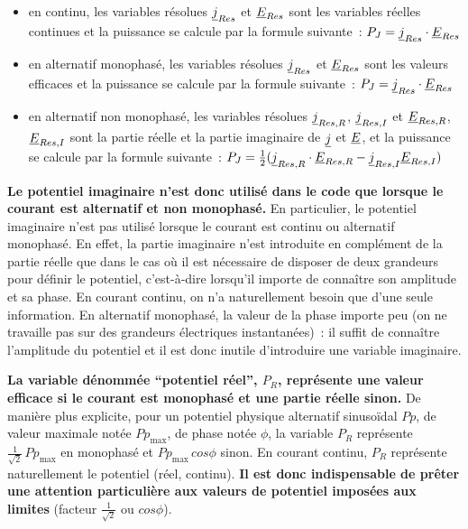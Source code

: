 \begin{itemize}
  \begin{itemize}
  \item en continu, les variables r\'esolues
$\underline{j}_{Res}$ et $\underline{E}_{Res}$
sont les variables r\'eelles continues
et la puissance se calcule par la formule suivante~:
$P_J=\underline{j}_{Res}\cdot\underline{E}_{Res}$
  \item en alternatif monophas\'e, les variables r\'esolues
$\underline{j}_{Res}$ et $\underline{E}_{Res}$
sont les valeurs efficaces
et la puissance se calcule par la formule suivante~:
$P_J=\underline{j}_{Res}\cdot\underline{E}_{Res}$
  \item en alternatif non monophas\'e, les variables r\'esolues
$\underline{j}_{Res,R}$, $\underline{j}_{Res,I}$ et $\underline{E}_{Res,R}$, $\underline{E}_{Res,I}$
sont la partie r\'eelle et la partie imaginaire de $\underline{j}$ et $\underline{E}$,
et la puissance se calcule par la formule suivante~:
$P_J=\frac{1}{2}(\underline{j}_{Res,R}\cdot\underline{E}_{Res,R}-\underline{j}_{Res,I}\underline{E}_{Res,I})$
  \end{itemize}

\end{itemize}


{\bf Le potentiel imaginaire n'est donc utilis\'e dans le code que lorsque
le courant est alternatif et non monophas\'e.}
En particulier, le potentiel imaginaire n'est pas utilis\'e lorsque le courant est
continu ou alternatif monophas\'e.
En effet, la partie imaginaire n'est introduite en compl\'ement de la partie
r\'eelle que dans le cas o\`u il est n\'ecessaire de disposer de deux grandeurs
pour d\'efinir le potentiel, c'est-\`a-dire lorsqu'il importe de conna\^itre son
amplitude et sa phase.
En courant continu, on n'a naturellement besoin que d'une seule information. En
alternatif monophas\'e, la valeur de la phase importe peu
(on ne travaille pas sur des grandeurs \'electriques instantan\'ees)~:
il suffit de conna\^itre l'amplitude du potentiel et il est donc inutile
d'introduire une variable imaginaire.


{\bf La variable d\'enomm\'ee ``potentiel r\'eel'', $P_R$, repr\'esente une
valeur efficace
si le courant est monophas\'e et une partie r\'eelle sinon.}
De mani\`ere plus explicite, pour un potentiel physique alternatif sinuso\"idal
$Pp$, de valeur maximale not\'ee $Pp_\text{max}$, de phase not\'ee $\phi$, la
variable $P_R$ repr\'esente $\frac{1}{\sqrt{2}}\,Pp_\text{max}$ en
monophas\'e et $Pp_\text{max}\,cos\phi$ sinon. En courant continu, $P_R$
repr\'esente naturellement le potentiel (r\'eel, continu).
{\bf Il est donc indispensable de pr\^eter une attention particuli\`ere aux
valeurs de potentiel impos\'ees aux limites} (facteur $\frac{1}{\sqrt{2}}$ ou
$cos\phi$).

